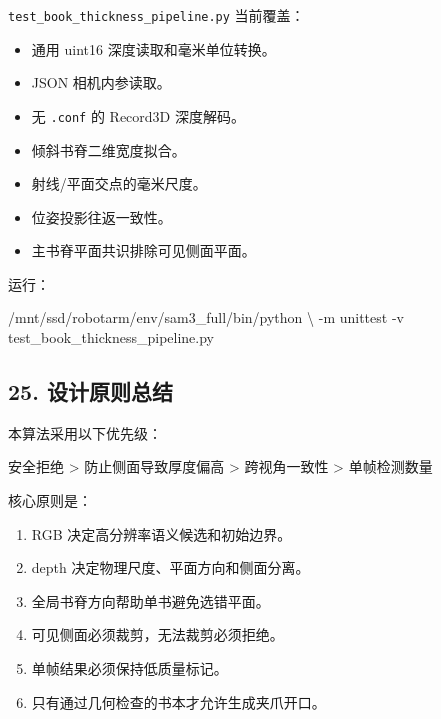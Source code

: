 \documentclass[
  chinese,
  11pt,
  a4paper,
]{article}
\newenvironment{Shaded}{\begin{snugshade}}{\end{snugshade}}
\newcommand{\AttributeTok}[1]{\textcolor[rgb]{0.13,0.29,0.53}{#1}}
\newcommand{\DataTypeTok}[1]{\textcolor[rgb]{0.13,0.29,0.53}{#1}}
\newcommand{\ExtensionTok}[1]{#1}
\newcommand{\NormalTok}[1]{#1}
\providecommand{\tightlist}{%
  \setlength{\itemsep}{0pt}\setlength{\parskip}{0pt}}
\begin{document}
\texttt{test\_book\_thickness\_pipeline.py} 当前覆盖：

\begin{itemize}
\tightlist
\item
  通用 uint16 深度读取和毫米单位转换。
\item
  JSON 相机内参读取。
\item
  无 \texttt{.conf} 的 Record3D 深度解码。
\item
  倾斜书脊二维宽度拟合。
\item
  射线/平面交点的毫米尺度。
\item
  位姿投影往返一致性。
\item
  主书脊平面共识排除可见侧面平面。
\end{itemize}

运行：

\begin{Shaded}
\begin{Highlighting}[]
\ExtensionTok{/mnt/ssd/robotarm/env/sam3\_full/bin/python} \DataTypeTok{\textbackslash{}}
  \AttributeTok{{-}m}\NormalTok{ unittest }\AttributeTok{{-}v}\NormalTok{ test\_book\_thickness\_pipeline.py}
\end{Highlighting}
\end{Shaded}

\subsection{25.
设计原则总结}\label{25-ux8bbeux8ba1ux539fux5219ux603bux7ed3}

本算法采用以下优先级：

\begin{Shaded}
\begin{Highlighting}[]
\NormalTok{安全拒绝}
\NormalTok{  \textgreater{} 防止侧面导致厚度偏高}
\NormalTok{  \textgreater{} 跨视角一致性}
\NormalTok{  \textgreater{} 单帧检测数量}
\end{Highlighting}
\end{Shaded}

核心原则是：

\begin{enumerate}
\def\labelenumi{\arabic{enumi}.}
\tightlist
\item
  RGB 决定高分辨率语义候选和初始边界。
\item
  depth 决定物理尺度、平面方向和侧面分离。
\item
  全局书脊方向帮助单书避免选错平面。
\item
  可见侧面必须裁剪，无法裁剪必须拒绝。
\item
  单帧结果必须保持低质量标记。
\item
  只有通过几何检查的书本才允许生成夹爪开口。
\end{enumerate}
\end{document}
